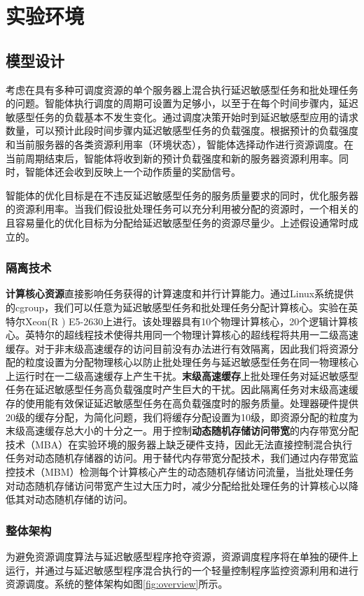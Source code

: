 \chapter{实验环境}
\section{模型设计}
考虑在具有多种可调度资源的单个服务器上混合执行延迟敏感型任务和批处理任务的问题。智能体执行调度的周期可设置为足够小，以至于在每个时间步骤内，延迟敏感型任务的负载基本不发生变化。通过调度决策开始时到延迟敏感型应用的请求数量，可以预计此段时间步骤内延迟敏感型任务的负载强度。根据预计的负载强度和当前服务器的各类资源利用率（环境状态），智能体选择动作进行资源调度。在当前周期结束后，智能体将收到新的预计负载强度和新的服务器资源利用率。同时，智能体还会收到反映上一个动作质量的奖励信号。

智能体的优化目标是在不违反延迟敏感型任务的服务质量要求的同时，优化服务器的资源利用率。当我们假设批处理任务可以充分利用被分配的资源时，一个相关的且容易量化的优化目标为分配给延迟敏感型任务的资源尽量少。上述假设通常时成立的。

\subsection{隔离技术}
\textbf{计算核心资源}直接影响任务获得的计算速度和并行计算能力。通过Linux系统提供的cgroup，我们可以任意为延迟敏感型任务和批处理任务分配计算核心。实验在英特尔Xeon(R
) E5-2630上进行。该处理器具有10个物理计算核心，20个逻辑计算核心。英特尔的超线程技术使得共用同一个物理计算核心的超线程将共用一二级高速缓存。对于非末级高速缓存的访问目前没有办法进行有效隔离，因此我们将资源分配的粒度设置为分配物理核心以防止批处理任务与延迟敏感型任务在同一物理核心上运行时在一二级高速缓存上产生干扰。\textbf{末级高速缓存}上批处理任务对延迟敏感型任务在延迟敏感型任务高负载强度时产生巨大的干扰。因此隔离任务对末级高速缓存的使用能有效保证延迟敏感型任务在高负载强度时的服务质量。处理器硬件提供20级的缓存分配，为简化问题，我们将缓存分配设置为10级，即资源分配的粒度为末级高速缓存总大小的十分之一。用于控制\textbf{动态随机存储访问带宽}的内存带宽分配技术（MBA）在实验环境的服务器上缺乏硬件支持，因此无法直接控制混合执行任务对动态随机存储器的访问。用于替代内存带宽分配技术，我们通过内存带宽监控技术（MBM）检测每个计算核心产生的动态随机存储访问流量，当批处理任务对动态随机存储访问带宽产生过大压力时，减少分配给批处理任务的计算核心以降低其对动态随机存储的访问。

\subsection{整体架构}
为避免资源调度算法与延迟敏感型程序抢夺资源，资源调度程序将在单独的硬件上运行，并通过与延迟敏感型程序混合执行的一个轻量控制程序监控资源利用和进行资源调度。系统的整体架构如图\ref{fig:overview}所示。

